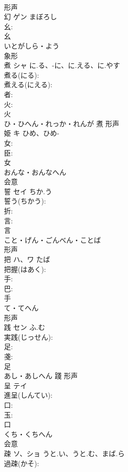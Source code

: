 \documentclass[8pt]{extreport}
\begin{document}
\begin{CJK}{UTF8}{min}
\\	形声 
\\	幻	ゲン	まぼろし		
\\	幺: 
\\	幺	
\\	いとがしら・よう	
\\	象形 
\\	煮	シャ	に.る、-に、に.える、に.やす		
\\	煮る(にる): 
\\	煮える(にえる): 
\\	者: 
\\	火: 
\\	火	
\\	ひ・ひへん・れっか・れんが	煮	形声 
\\	姫	キ	ひめ、ひめ-		
\\	女: 
\\	臣: 
\\	女	
\\	おんな・おんなへん	
\\	会意 
\\	誓	セイ	ちか.う		
\\	誓う(ちかう): 
\\	折: 
\\	言: 
\\	言	
\\	こと・げん・ごんべん・ことば	
\\	形声 
\\	把	ハ、ワ		たば	
\\	把握(はあく): 
\\	手: 
\\	巴: 
\\	手	
\\	て・てへん	
\\	形声 
\\	践	セン	ふ.む		
\\	実践(じっせん): 
\\	足: 
\\	戔: 
\\	足	
\\	あし・あしへん	踐	形声 
\\	呈	テイ			
\\	進呈(しんてい): 
\\	口: 
\\	玉: 
\\	口	
\\	くち・くちへん	
\\	会意 
\\	疎	ソ、ショ	うと.い、うと.む、まば.ら		
\\	過疎(かそ): 

\end{CJK}
\end{document}
